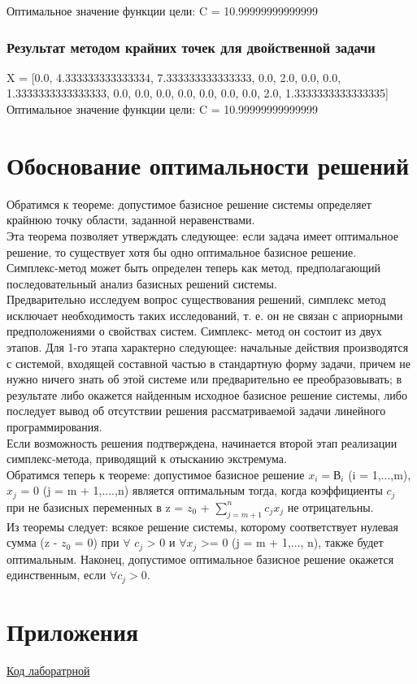 \documentclass[a4]{article}
\begin{document}
					Оптимальное значение функции цели: C = 10.99999999999999
				\subsubsection{Результат методом крайних точек для двойственной задачи}
					X = [0.0, 4.333333333333334, 7.333333333333333, 0.0, 2.0, 0.0, 0.0, 1.3333333333333333, 0.0, 0.0, 0.0, 0.0, 0.0, 0.0, 0.0, 2.0, 1.3333333333333335]\\
					
					Оптимальное значение функции цели: C = 10.99999999999999
	\section{Обоснование оптимальности решений}
		Обратимся к теореме: допустимое базисное решение системы определяет крайнюю точку области, заданной неравенствами.\\
		Эта теорема позволяет утверждать следующее: если задача имеет оптимальное решение, то существует хотя бы одно оптимальное базисное решение.\\ Симплекс-метод может быть определен теперь как метод, предполагающий последовательный анализ базисных решений системы.\\
		Предварительно исследуем вопрос существования решений, симплекс метод исключает необходимость таких исследований, т. е. он не связан с априорными предположениями о свойствах систем. Симплекс- метод он состоит из двух этапов. Для 1-го этапа характерно следующее: начальные действия производятся с системой, входящей составной частью в стандартную форму задачи, причем не нужно ничего знать об этой системе или предварительно ее преобразовывать; в результате либо окажется найденным исходное базисное решение системы, либо последует вывод об отсутствии решения рассматриваемой задачи линейного программирования.\\
		Если возможность решения подтверждена, начинается второй этап реализации симплекс-метода, приводящий к отысканию экстремума.\\
		Обратимся теперь к теореме: допустимое базисное решение $x_i = В_i$ (i = 1,...,m), $x_j$ = 0 (j = m + 1,....,n) является оптимальным тогда, когда коэффициенты $c_j$ при не базисных переменных в z = $z_0$ + $\sum_{j = m+ 1}^{n} c_jx_j$ не отрицательны.\\
		Из теоремы следует: всякое решение системы, которому соответствует нулевая сумма (z - $z_0$ = 0) при $\forall$ $c_j$ > 0 и $\forall$$x_j$ >= 0 (j = m + 1,..., n), также будет оптимальным. Наконец, допустимое оптимальное базисное решение окажется единственным, если $\forall c_j > 0$.
	\section{Приложения}
		\href{https://github.com/LuciusGen/MetOpt/tree/master/venv}{Код лаборатрной}
	
\end{document}
